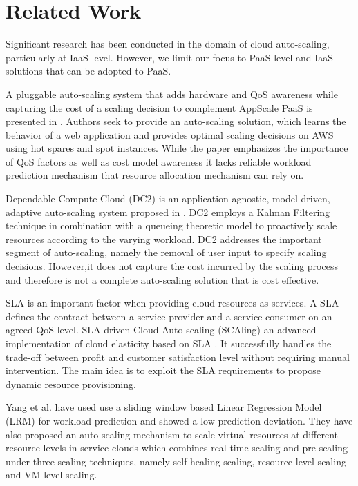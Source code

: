 \section{Related Work}
Significant research has been conducted in the domain of cloud auto-scaling, particularly at IaaS level. However, we limit our focus to PaaS level and IaaS solutions that can be adopted to PaaS.

A pluggable auto-scaling system that adds hardware and QoS awareness while capturing the cost of a scaling decision to complement AppScale PaaS is presented in \cite{Bunch_2012}. Authors seek to provide an auto-scaling solution, which learns the behavior of a web application and provides optimal scaling decisions on AWS using hot spares and spot instances. While the paper emphasizes the importance of QoS factors as well as cost model awareness it lacks reliable workload prediction mechanism that resource allocation mechanism can rely on.

Dependable Compute Cloud (DC2) is an application agnostic, model driven, adaptive auto-scaling system proposed in \cite{modeldriven}. DC2 employs a Kalman Filtering technique in combination with a queueing theoretic model to proactively scale resources according to the varying workload. DC2 addresses the important segment of auto-scaling, namely the removal of user input to specify scaling decisions. However,it does not capture the cost incurred by the scaling process and therefore is not a complete auto-scaling solution that is cost effective.

SLA is an important factor when providing cloud resources as services. A SLA defines the contract between a service provider and a service consumer on an agreed QoS level. SLA-driven Cloud Auto-scaling (SCAling) an advanced implementation of cloud elasticity based on SLA \cite{sladriven}. It successfully handles the trade-off between profit and customer satisfaction level without requiring manual intervention. The main idea is to exploit the SLA requirements to propose dynamic resource provisioning.

Yang et al. \cite{Yang_2013} have used use a sliding window based Linear Regression Model (LRM) for workload prediction and showed a low prediction deviation. They have also proposed an auto-scaling mechanism to scale virtual resources at different resource levels in service clouds which combines real-time scaling and pre-scaling under three scaling techniques, namely self-healing scaling, resource-level scaling and VM-level scaling.

